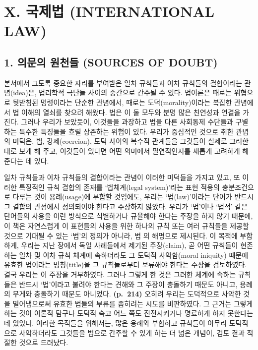 \section{X. 국제법 (INTERNATIONAL
LAW)}\label{x.-uxad6duxc81cuxbc95-international-law}

\subsection{1. 의문의 원천들 (SOURCES OF
DOUBT)}\label{uxc758uxbb38uxc758-uxc6d0uxcc9cuxb4e4-sources-of-doubt}

본서에서 그토록 중요한 자리를 부여받은 일차 규칙들과 이차 규칙들의
결합이라는 관념(idea)은, 법리학적 극단들 사이의 중간으로 간주될 수 있다.
법이론은 때로는 위협으로 뒷받침된 명령이라는 단순한 관념에서, 때로는
도덕(morality)이라는 복잡한 관념에서 법 이해의 열쇠를 찾으려 해왔다.
법은 이 둘 모두와 분명 많은 친연성과 연결을 가진다. 그러나 우리가
보았듯이, 이것들을 과장하고 법을 다른 사회통제 수단들과 구별하는 특수한
특징들을 흐릴 상존하는 위험이 있다. 우리가 중심적인 것으로 취한 관념의
미덕은, 법, 강제(coercion), 도덕 사이의 복수적 관계들을 그것들이 실제로
그러한 대로 보게 해 주고, 이것들이 있다면 어떤 의미에서 필연적인지를
새롭게 고려하게 해 준다는 데 있다.

일차 규칙들과 이차 규칙들의 결합이라는 관념이 이러한 미덕들을 가지고
있고, 또 이러한 특징적인 규칙 결합의 존재를 ‘법체계(legal system)’라는
표현 적용의 충분조건으로 다루는 것이 용례(usage)에 부합할 것임에도,
우리는 ‘법(law)’이라는 단어가 반드시 그 결합의 관점에서 정의되어야
한다고 주장하지 않았다. 우리가 ‘법’이나 ‘법적’ 같은 단어들의 사용을 이런
방식으로 식별하거나 규율해야 한다는 주장을 하지 않기 때문에, 이 책은
자연스럽게 이 표현들의 사용을 위한 하나의 규칙 또는 여러 규칙들을 제공할
것으로 기대될 수 있는 ‘법’의 정의가 아니라, 법 의
해명으로 제시된다. 이 목적에 부합하게, 우리는 지난 장에서 독일
사례들에서 제기된 주장(claim), 곧 어떤 규칙들이 현존하는 일차 및 이차
규칙 체계에 속하더라도 그 도덕적 사악함(moral iniquity) 때문에 유효한
법이라는 명칭(title)을 그 규칙들로부터 보류해야 한다는 주장을
검토하였다. 결국 우리는 이 주장을 거부하였다. 그러나 그렇게 한 것은
그러한 체계에 속하는 규칙들은 반드시 ‘법’이라고 불려야 한다는 견해와 그
주장이 충돌하기 때문도 아니고, 용례의 무게와 충돌하기 때문도 아니었다.
\textbf{(p.~214)} 오히려 우리는 도덕적으로 사악한 것을 밀어냄으로써
유효한 법들의 부류를 좁히려는 시도를 비판하였다. 그 근거는 그렇게 하는
것이 이론적 탐구나 도덕적 숙고 어느 쪽도 진전시키거나 명료하게 하지
못한다는 데 있었다. 이러한 목적들을 위해서는, 많은 용례와 부합하고
규칙들이 아무리 도덕적으로 사악하더라도 그것들을 법으로 간주할 수 있게
하는 더 넓은 개념이, 검토 결과 적절한 것으로 드러났다.

